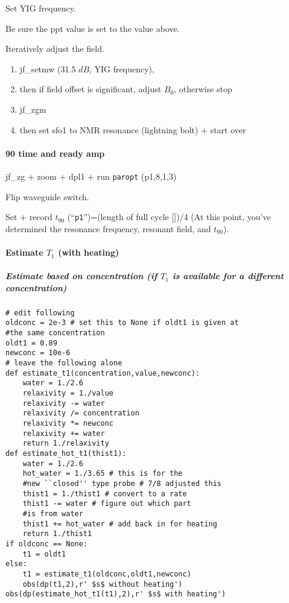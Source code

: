 Set YIG frequency.

Be sure the ppt value is set to the value above.

Iteratively adjust the field.
{\small
\begin{enumerate}
	\item jf\_setmw (31.5 $dB$, YIG frequency),
	\item then if field offset is significant, adjust $B_0$, otherwise stop
	\item jf\_zgm
	\item then set sfo1 to NMR resonance (lightning bolt) + start over
\end{enumerate}
}

\paragraph{90 time and ready amp}
jf\_zg + zoom + dpl1 + run {\tt paropt} (p1,8,1,3)

Flip waveguide switch.

Set + record $t_{90}$ (``\texttt{p1}'')=(length of full cycle [\us])/4 (At this point, you've determined the resonance frequency, resonant field, and $t_{90}$).

\paragraph{Estimate $T_1$ (with heating)}

\subparagraph{Estimate based on concentration {\tiny (if $T_1$ is available for a different concentration)}}

\begin{lstlisting}
# edit following
oldconc = 2e-3 # set this to None if oldt1 is given at
#the same concentration
oldt1 = 0.89
newconc = 10e-6
# leave the following alone
def estimate_t1(concentration,value,newconc):
    water = 1./2.6
    relaxivity = 1./value
    relaxivity -= water
    relaxivity /= concentration
    relaxivity *= newconc
    relaxivity += water
    return 1./relaxivity
def estimate_hot_t1(thist1):
    water = 1./2.6
    hot_water = 1./3.65 # this is for the
    #new ``closed'' type probe # 7/8 adjusted this
    thist1 = 1./thist1 # convert to a rate
    thist1 -= water # figure out which part
    #is from water
    thist1 += hot_water # add back in for heating
    return 1./thist1
if oldconc == None:
    t1 = oldt1
else:
    t1 = estimate_t1(oldconc,oldt1,newconc)
    obs(dp(t1,2),r' $s$ without heating')
obs(dp(estimate_hot_t1(t1),2),r' $s$ with heating')
\end{lstlisting}

